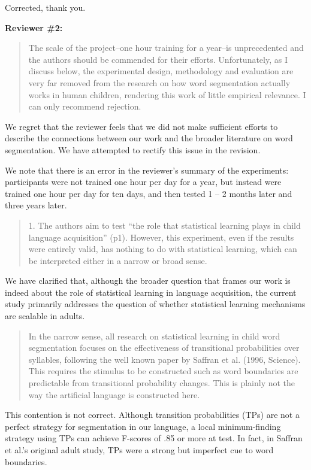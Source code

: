 \documentclass[12pt]{letter}
\begin{document}
Corrected, thank you.

{\bf Reviewer \#2: }

\begin{quote}
  The scale of the project--one hour training for a year--is unprecedented and the authors should be commended for their efforts. Unfortunately, as I discuss below, the experimental design, methodology and evaluation are very far removed from the research on how word segmentation actually works in human children, rendering this work of little empirical relevance. I can only recommend rejection.
\end{quote}

We regret that the reviewer feels that we did not make sufficient efforts to describe the connections between our work and the broader literature on word segmentation. We have attempted to rectify this issue in the revision.

We note that there is an error in the reviewer's summary of the experiments: participants were not trained one hour per day for a year, but instead were trained one hour per day for ten days, and then tested 1 -- 2 months later and three years later.

\begin{quote}
1. The authors aim to test ``the role that statistical learning plays in child language acquisition'' (p1). However, this experiment, even if the results were entirely valid, has nothing to do with statistical learning, which can be interpreted either in a narrow or broad sense. 
\end{quote}

We have clarified that, although the broader question that frames our work is indeed about the role of statistical learning in language acquisition, the current study primarily addresses the question of whether statistical learning mechanisms are scalable in adults.

\begin{quote}
In the narrow sense, all research on statistical learning in child word segmentation focuses on the effectiveness of transitional probabilities over syllables, following the well known paper by Saffran et al. (1996, Science). This requires the stimulus to be constructed such as word boundaries are predictable from transitional probability changes. This is plainly not the way the artificial language is constructed here.
\end{quote}

This contention is not correct. Although transition probabilities (TPs) are not a perfect strategy for segmentation in our language, a local minimum-finding strategy using TPs can achieve F-scores of .85 or more at test. In fact, in Saffran et al.'s original adult study, TPs were a strong but imperfect cue to word boundaries. 
\end{document}
